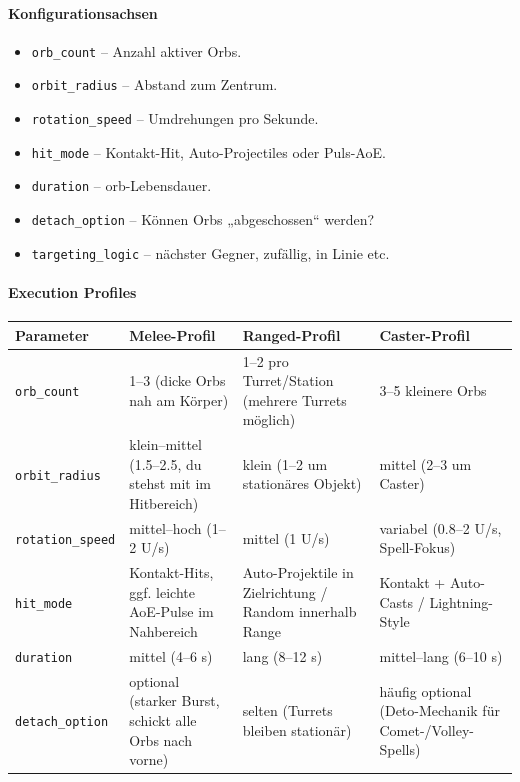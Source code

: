\paragraph{Konfigurationsachsen}{}

\begin{itemize}
	\item \texttt{orb\_count} – Anzahl aktiver Orbs.
	\item \texttt{orbit\_radius} – Abstand zum Zentrum.
	\item \texttt{rotation\_speed} – Umdrehungen pro Sekunde.
	\item \texttt{hit\_mode} – Kontakt-Hit, Auto-Projectiles oder Puls-AoE.
	\item \texttt{duration} – orb-Lebensdauer.
	\item \texttt{detach\_option} – Können Orbs „abgeschossen“ werden?
	\item \texttt{targeting\_logic} – nächster Gegner, zufällig, in Linie etc.
\end{itemize}

\paragraph{Execution Profiles}{}
\scriptsize %
\begin{tabular}{p{3cm} | p{4cm} | p{4cm} | p{4cm}}
	Parameter        & Melee-Profil                                              & Ranged-Profil                                                & Caster-Profil                                                   \\
	\hline
	\texttt{orb\_count}      & 1–3 (dicke Orbs nah am Körper)                            & 1–2 pro Turret/Station (mehrere Turrets möglich)            & 3–5 kleinere Orbs                                               \\
	\texttt{orbit\_radius}   & klein–mittel (1.5–2.5, du stehst mit im Hitbereich)       & klein (1–2 um stationäres Objekt)                           & mittel (2–3 um Caster)                                         \\
	\texttt{rotation\_speed} & mittel–hoch (1–2 U/s)                                     & mittel (1 U/s)                                              & variabel (0.8–2 U/s, Spell-Fokus)                              \\
	\texttt{hit\_mode}       & Kontakt-Hits, ggf. leichte AoE-Pulse im Nahbereich       & Auto-Projektile in Zielrichtung / Random innerhalb Range    & Kontakt + Auto-Casts / Lightning-Style                         \\
	\texttt{duration}       & mittel (4–6 s)                                           & lang (8–12 s)                                               & mittel–lang (6–10 s)                                           \\
	\texttt{detach\_option}  & optional (starker Burst, schickt alle Orbs nach vorne)    & selten (Turrets bleiben stationär)                          & häufig optional (Deto-Mechanik für Comet-/Volley-Spells)       \\
	\hline
\end{tabular}
\normalsize
